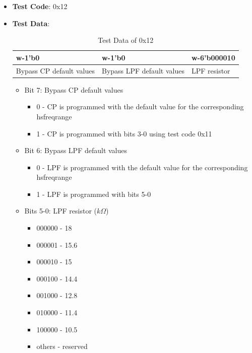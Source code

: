 \documentclass[main\_\_EN.tex]{subfiles}
\begin{document}
\begin{itemize}
    \item \textbf{Test Code}: 0x12
    \item \textbf{Test Data}: 
        \begin{longtable}{ |p{4cm}|p{4cm}|p{4cm}|}
            \caption{Test Data of 0x12}
            \label{tab:test-data-0x12} \\
            \hline
            \rowcolor{lightgray}
            \textbf{w-1'b0} & \textbf{w-1'b0} & \textbf{w-6'b000010} \\ \hline
            Bypass CP default values & Bypass LPF default values & LPF resistor  \\ \hline
        \end{longtable}
        \begin{itemize}
            \item Bit 7: Bypass CP default values
                \begin{itemize}
                    \item 0 - CP is programmed with the default value for the corresponding hsfreqrange
                    \item 1 - CP is programmed with bits 3-0 using test code 0x11
                \end{itemize}
            \item Bit 6: Bypass LPF default values
                \begin{itemize}
                    \item 0 - LPF is programmed with the default value for the corresponding hsfreqrange
                    \item 1 - LPF is programmed with bits 5-0
                \end{itemize}
            \item Bits 5-0: LPF resistor ($k\Omega$)
                \begin{itemize}
                    \item 000000 - 18
                    \item 000001 - 15.6
                    \item 000010 - 15
                    \item 000100 - 14.4
                    \item 001000 - 12.8
                    \item 010000 - 11.4
                    \item 100000 - 10.5
                    \item others - reserved

\end{itemize}
\end{itemize}
\end{itemize}
\end{document}
